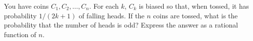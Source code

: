 You have coins $C_1,C_2,\ldots,C_n$.  For each $k$, $C_k$ is biased so
that, when tossed, it has probability $1/(2k+1)$ of falling heads.
If the $n$ coins are tossed, what is the probability that the number of
heads is odd?  Express the answer as a rational function of $n$.

